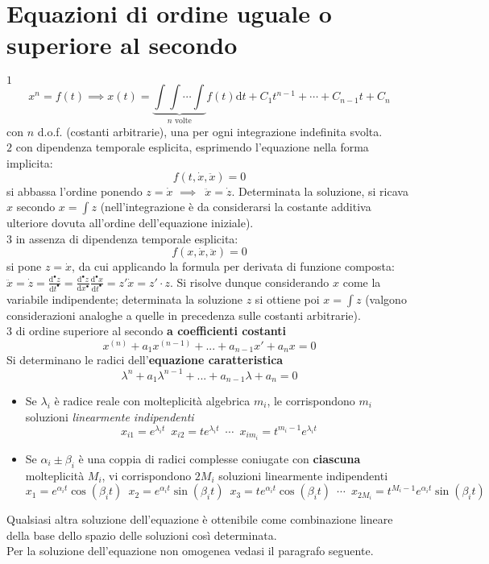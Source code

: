 \documentclass[10pt, oneside]{book}
\theoremstyle{plain}
\begin{document}
\section{Equazioni di ordine uguale o superiore al secondo}
$\boxed{1}$
\[x^n = f(t) \implies x(t) = \underbrace{\int \int \cdots \int}_{n \textrm{ volte}} f(t)\textrm{d}t + C_1 t^{n-1} + \cdots + C_{n-1} t + C_n\]
con $n$ d.o.f. (costanti arbitrarie), una per ogni integrazione indefinita svolta.
\\$\boxed{2}$ con dipendenza temporale esplicita, esprimendo l'equazione nella forma implicita:
\[f(t, \dot x, \ddot x) = 0\]
si abbassa l'ordine ponendo $z = \dot x$ $\implies \enspace \ddot x = \dot z$. Determinata la soluzione, si ricava $x$ secondo $x = \int z$ (nell'integrazione è da considerarsi la costante additiva ulteriore dovuta all'ordine dell'equazione iniziale).
\\$\boxed{3}$ in assenza di dipendenza temporale esplicita:
\[f(x, \dot x, \ddot x) = 0\]
si pone $z = \dot x$, da cui applicando la formula per derivata di funzione composta: $\displaystyle \ddot x = \dot z = \frac{\textrm{d}^{•} z}{\textrm{d}t^{•}} = \frac{\textrm{d}^{•} z}{\textrm{d}x^{•}} \frac{\textrm{d}^{•} x}{\textrm{d}t^{•}} = z' \dot x = z' \cdot z$. Si risolve dunque considerando $x$ come la variabile indipendente; determinata la soluzione $z$ si ottiene poi $x = \int z$ (valgono considerazioni analoghe a quelle in precedenza sulle costanti arbitrarie).
\\$\boxed{3}$ di ordine superiore al secondo \textbf{a coefficienti costanti}
\[x^{(n)} + a_1 x^{(n-1)} + ... + a_{n-1} x' + a_n x = 0\]
Si determinano le radici dell'\textbf{equazione caratteristica}
\[\lambda^n + a_1 \lambda^{n-1} + ... + a_{n-1} \lambda + a_n = 0\]
\begin{itemize}
\item Se $\lambda_i$ è radice reale con molteplicità algebrica $m_i$, le corrispondono $m_i$ soluzioni \textit{linearmente indipendenti} \[x_{i1} = e^{\lambda_i t} \enspace x_{i2} = t e^{\lambda_i t}\enspace \cdots\enspace  x_{im_i} = t^{m_i - 1}e^{\lambda_i t}\]
\item Se $\alpha_i \pm \beta_i$ è una coppia di radici complesse coniugate con \textbf{ciascuna} molteplicità $M_i$, vi corrispondono $2M_i$ soluzioni linearmente indipendenti
\[x_1 = e^{\alpha_i t}\cos(\beta_i t) \enspace x_2 = e^{\alpha_i t}\sin(\beta_i t) \enspace x_3 = t e^{\alpha_i t}\cos(\beta_i t) \enspace \cdots \enspace x_{2M_i} = t^{M_i - 1}e^{\alpha_i t}\sin(\beta_i t)\]
\end{itemize}
Qualsiasi altra soluzione dell'equazione è ottenibile come combinazione lineare della base dello spazio delle soluzioni così determinata.
\\Per la soluzione dell'equazione non omogenea vedasi il paragrafo seguente.
\end{document}
